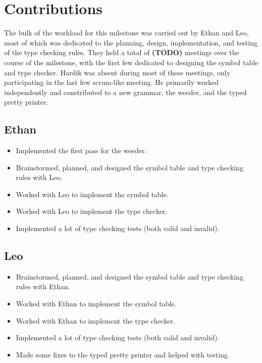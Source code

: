 \documentclass{article}
\begin{document}
\section*{Contributions}

The bulk of the workload for this milestone was carried out by Ethan and Leo, most of which was dedicated to the planning, design, implementation, and testing of the type checking rules.
They held a total of \textbf{(TODO)} meetings over the course of the milestone, with the first few dedicated to designing the symbol table and type checker.
Hardik was absent during most of these meetings, only participating in the last few scrum-like meeting.
He primarily worked independently and constributed to a new grammar, the weeder, and the typed pretty printer.

\subsection*{Ethan}

\begin{itemize}
    \item Implemented the first pass for the weeder.
    \item Brainstormed, planned, and designed the symbol table and type checking rules with Leo.
    \item Worked with Leo to implement the symbol table.
    \item Worked with Leo to implement the type checker.
    \item Implemented a lot of type checking tests (both valid and invalid).
\end{itemize}

\subsection*{Leo}

\begin{itemize}
    \item Brainstormed, planned, and designed the symbol table and type checking rules with Ethan.
    \item Worked with Ethan to implement the symbol table.
    \item Worked with Ethan to implement the type checker.
    \item Implemented a lot of type checking tests (both valid and invalid).
    \item Made some fixes to the typed pretty printer and helped with testing.
\end{itemize}
\end{document}
